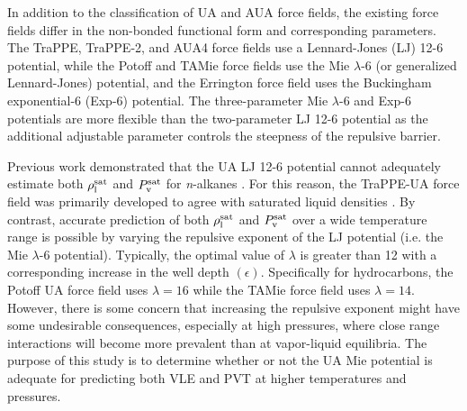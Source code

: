 \documentclass[journal=jctc,manuscript=article]{achemso}
\begin{document}
%
%

In addition to the classification of UA and AUA force fields, the existing force fields differ in the non-bonded functional form and corresponding parameters. The TraPPE, TraPPE-2, and AUA4 force fields use a Lennard-Jones (LJ) 12-6 potential, while the Potoff and TAMie force fields use the Mie $\lambda$-6 (or generalized Lennard-Jones) potential, and the Errington force field uses the Buckingham exponential-6 (Exp-6) potential. The three-parameter Mie $\lambda$-6 and Exp-6 potentials are more flexible than the two-parameter LJ 12-6 potential as the additional adjustable parameter controls the steepness of the repulsive barrier.


Previous work demonstrated that the UA LJ 12-6 potential cannot adequately estimate both $\rho_{\rm l}^{\rm sat}$ and $P_{\rm v}^{\rm sat}$ for \textit{n}-alkanes \cite{Pareto_LJPQ,Mess4}. For this reason, the TraPPE-UA force field was primarily developed to agree with saturated liquid densities \cite{TraPPE}. By contrast, accurate prediction of both $\rho_{\rm l}^{\rm sat}$ and $P_{\rm v}^{\rm sat}$ over a wide temperature range is possible by varying the repulsive exponent of the LJ potential (i.e. the Mie $\lambda$-6 potential). Typically, the optimal value of $\lambda$ is greater than 12 with a corresponding increase in the well depth $(\epsilon)$. Specifically for hydrocarbons, the Potoff UA force field uses $\lambda = 16$ while the TAMie force field uses $\lambda = 14$. However, there is some concern that increasing the repulsive exponent might have some undesirable consequences, especially at high pressures, where close range interactions will become more prevalent than at vapor-liquid equilibria. The purpose of this study is to determine whether or not the UA Mie potential is adequate for predicting both VLE and PVT at higher temperatures and pressures. 
\end{document}
